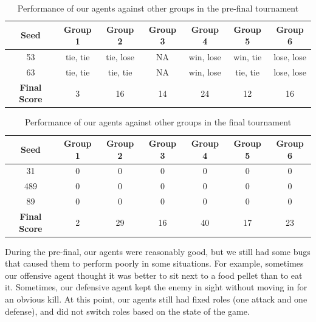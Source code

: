 \documentclass[a4paper,12pt]{article}
\begin{document}

\begin{table}[!hptb]
  \centering
  \begin{tabular}{|c|c|c|c|c|c|c|}
    \hline
    \textbf{Seed} & \textbf{Group 1} & \textbf{Group 2} & \textbf{Group 3} & \textbf{Group 4} & \textbf{Group 5} & \textbf{Group 6} \\
    \hline
    53 & tie, tie & tie, lose & NA & win, lose & win, tie & lose, lose \\
    \hline
    63 & tie, tie & tie, tie & NA & win, lose & tie, tie & lose, lose \\
    \hline
    \textbf{Final Score} & 3 & 16 & 14 & 24 & 12 & 16 \\
    \hline

  \end{tabular}
  \caption{Performance of our agents against other groups in the pre-final tournament}
  \label{tab:results_pre_final}
\end{table}


\begin{table}[!hptb]
  \centering
  \begin{tabular}{|c|c|c|c|c|c|c|}
    \hline
    \textbf{Seed} & \textbf{Group 1} & \textbf{Group 2} & \textbf{Group 3} & \textbf{Group 4} & \textbf{Group 5} & \textbf{Group 6} \\
    \hline
    31 & 0 & 0 & 0 & 0 & 0 & 0 \\
    \hline
    489 & 0 & 0 & 0 & 0 & 0 & 0 \\
    \hline
    89 & 0 & 0 & 0 & 0 & 0 & 0 \\
    \hline
    \textbf{Final Score} & 2 & 29 & 16 & 40 & 17 & 23 \\
    \hline

  \end{tabular}
  \caption{Performance of our agents against other groups in the final tournament}
  \label{tab:results_final}
\end{table}

During the pre-final, our agents were reasonably good, but we still had some bugs that caused them to perform poorly in some situations. For example, sometimes our offensive agent thought it was better to sit next to a food pellet than to eat it. Sometimes, our defensive agent kept the enemy in sight without moving in for an obvious kill. At this point, our agents still had fixed roles (one attack and one defense), and did not switch roles based on the state of the game.
\end{document}
